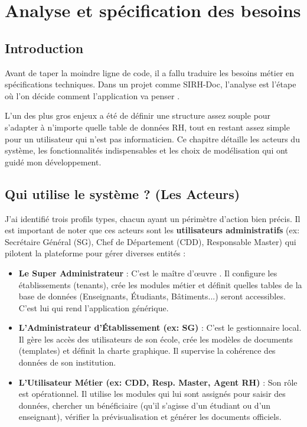 
\chapter{Analyse et spécification des besoins}

\section{Introduction}

Avant de taper la moindre ligne de code, il a fallu traduire les besoins métier en spécifications techniques. Dans un projet comme SIRH-Doc, l'analyse est l'étape où l'on décide comment l'application va \og penser \fg{}. 

L'un des plus gros enjeux a été de définir une structure assez souple pour s'adapter à n'importe quelle table de données RH, tout en restant assez simple pour un utilisateur qui n'est pas informaticien. Ce chapitre détaille les acteurs du système, les fonctionnalités indispensables et les choix de modélisation qui ont guidé mon développement.

\section{Qui utilise le système ? (Les Acteurs)}

J'ai identifié trois profils types, chacun ayant un périmètre d'action bien précis. Il est important de noter que ces acteurs sont les \textbf{utilisateurs administratifs} (ex: Secrétaire Général (SG), Chef de Département (CDD), Responsable Master) qui pilotent la plateforme pour gérer diverses entités :

\begin{itemize}
    \item \textbf{Le Super Administrateur} : C'est le \og maître d'œuvre \fg{}. Il configure les établissements (tenants), crée les modules métier et définit quelles tables de la base de données (Enseignants, Étudiants, Bâtiments...) seront accessibles. C'est lui qui rend l'application générique.
    \item \textbf{L'Administrateur d'Établissement (ex: SG)} : C'est le gestionnaire local. Il gère les accès des utilisateurs de son école, crée les modèles de documents (templates) et définit la charte graphique. Il supervise la cohérence des données de son institution.
    \item \textbf{L'Utilisateur Métier (ex: CDD, Resp. Master, Agent RH)} : Son rôle est opérationnel. Il utilise les modules qui lui sont assignés pour saisir des données, chercher un bénéficiaire (qu'il s'agisse d'un étudiant ou d'un enseignant), vérifier la prévisualisation et générer les documents officiels.
\end{itemize}


